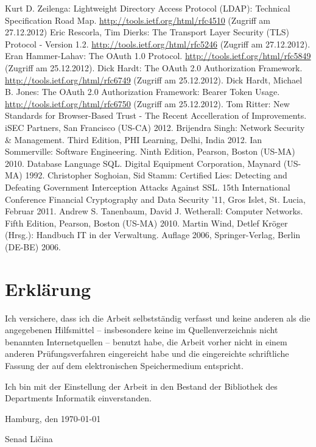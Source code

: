 \documentclass[12pt,a4paper,pointednumbers,abstracton]{scrartcl}
\begin{document}
\begin{raggedright}
\begin{thebibliography}{XXXXXXXX}
	 Kurt D. Zeilenga: Lightweight Directory Access Protocol (LDAP): Technical Specification Road Map. \url{http://tools.ietf.org/html/rfc4510} (Zugriff am 27.12.2012)
	 Eric Rescorla, Tim Dierks: The Transport Layer Security (TLS) Protocol - Version 1.2. \url{http://tools.ietf.org/html/rfc5246} (Zugriff am 27.12.2012).
	 Eran Hammer-Lahav: The OAuth 1.0 Protocol. \url{http://tools.ietf.org/html/rfc5849} (Zugriff am 25.12.2012).
	 Dick Hardt: The OAuth 2.0 Authorization Framework. \url{http://tools.ietf.org/html/rfc6749} (Zugriff am 25.12.2012).
	 Dick Hardt, Michael B. Jones: The OAuth 2.0 Authorization Framework: Bearer Token Usage. \url{http://tools.ietf.org/html/rfc6750} (Zugriff am 25.12.2012).
	 Tom Ritter: New Standards for Browser-Based Trust - The Recent Accelleration of Improvements. iSEC Partners, San Francisco (US-CA) 2012.
	 Brijendra Singh: Network Security \& Management. Third Edition, PHI Learning, Delhi, India 2012.
	 Ian Sommerville: Software Engineering. Ninth Edition, Pearson, Boston (US-MA) 2010.
	 Database Language SQL. Digital Equipment Corporation, Maynard (US-MA) 1992.
	 Christopher Soghoian, Sid Stamm: Certified Lies: Detecting and Defeating Government Interception Attacks Against SSL. 15th International Conference Financial Cryptography and Data Security '11, Gros Islet, St. Lucia, Februar 2011.
	 Andrew S. Tanenbaum, David J. Wetherall: Computer Networks. Fifth Edition, Pearson, Boston (US-MA) 2010.
	 Martin Wind, Detlef Kröger (Hrsg.): Handbuch IT in der Verwaltung. Auflage 2006, Springer-Verlag, Berlin (DE-BE) 2006.
\end{thebibliography}
\end{raggedright}


\newpage
{}
\section*{Erklärung}
Ich versichere, dass ich die Arbeit selbstständig verfasst und keine anderen als die angegebenen Hilfsmittel -- insbesondere keine im Quellenverzeichnis nicht benannten Internetquellen -- benutzt habe, die Arbeit vorher nicht in einem anderen Prüfungsverfahren eingereicht habe und die eingereichte schriftliche Fassung der auf dem elektronischen Speichermedium entspricht.

Ich bin mit der Einstellung der Arbeit in den Bestand der Bibliothek des Departments Informatik einverstanden.

Hamburg, den \today

\bigskip
Senad Ličina
\end{document}
